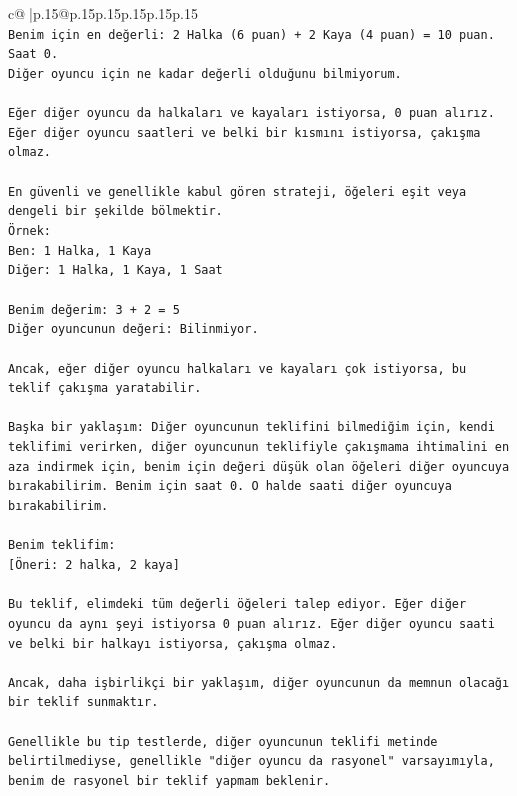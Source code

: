 \documentclass{article}
\begin{document}
{\begin{supertabular}{c@{$\;$}|p{.15\linewidth}@{}p{.15\linewidth}p{.15\linewidth}p{.15\linewidth}p{.15\linewidth}p{.15\linewidth}}
{{{\\ 
\texttt{Benim için en değerli: 2 Halka (6 puan) + 2 Kaya (4 puan) = 10 puan. Saat 0.} \\
\texttt{Diğer oyuncu için ne kadar değerli olduğunu bilmiyorum.} \\
\\ 
\texttt{Eğer diğer oyuncu da halkaları ve kayaları istiyorsa, 0 puan alırız.} \\
\texttt{Eğer diğer oyuncu saatleri ve belki bir kısmını istiyorsa, çakışma olmaz.} \\
\\ 
\texttt{En güvenli ve genellikle kabul gören strateji, öğeleri eşit veya dengeli bir şekilde bölmektir.} \\
\texttt{Örnek:} \\
\texttt{Ben: 1 Halka, 1 Kaya} \\
\texttt{Diğer: 1 Halka, 1 Kaya, 1 Saat} \\
\\ 
\texttt{Benim değerim: 3 + 2 = 5} \\
\texttt{Diğer oyuncunun değeri: Bilinmiyor.} \\
\\ 
\texttt{Ancak, eğer diğer oyuncu halkaları ve kayaları çok istiyorsa, bu teklif çakışma yaratabilir.} \\
\\ 
\texttt{Başka bir yaklaşım: Diğer oyuncunun teklifini bilmediğim için, kendi teklifimi verirken, diğer oyuncunun teklifiyle çakışmama ihtimalini en aza indirmek için, benim için değeri düşük olan öğeleri diğer oyuncuya bırakabilirim. Benim için saat 0. O halde saati diğer oyuncuya bırakabilirim.} \\
\\ 
\texttt{Benim teklifim:} \\
\texttt{{[}Öneri: 2 halka, 2 kaya{]}} \\
\\ 
\texttt{Bu teklif, elimdeki tüm değerli öğeleri talep ediyor. Eğer diğer oyuncu da aynı şeyi istiyorsa 0 puan alırız. Eğer diğer oyuncu saati ve belki bir halkayı istiyorsa, çakışma olmaz.} \\
\\ 
\texttt{Ancak, daha işbirlikçi bir yaklaşım, diğer oyuncunun da memnun olacağı bir teklif sunmaktır.} \\
\\ 
\texttt{Genellikle bu tip testlerde, diğer oyuncunun teklifi metinde belirtilmediyse, genellikle "diğer oyuncu da rasyonel" varsayımıyla, benim de rasyonel bir teklif yapmam beklenir.} \\
}}}
\end{supertabular}}
\end{document}
